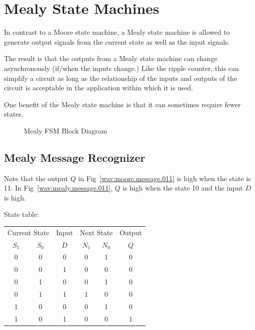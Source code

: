 \documentclass[10pt,letterpaper]{article}
\begin{document}
\FloatBarrier
\newpage

\section{Mealy State Machines}

In contrast to a Moore state machine, a Mealy state machine is allowed to 
generate output signals from the current state as well as the input signals.

The result is that the outputs from a Mealy state machine can change
asynchronously (if/when the inputs change.)
Like the ripple counter, this can simplify a circuit as long as the 
relationship of the inputs and outputs of the circuit is acceptable 
in the application within which it is used.

One benefit of the Mealy state machine is that it can sometimes require
fewer states.

\begin{figure}[ht]
\centering

\scalebox{.75}{}

\caption{Mealy FSM Block Diagram}
\label{wav:mealy.block.diagram}
\end{figure}

\subsection{Mealy Message Recognizer}

Note that the output $Q$ in Fig~\ref{wav:moore.message.011} is high when the state is 11. 
In Fig~\ref{wav:mealy.message.011}, $Q$ is high when the state 10 and the input $D$ is high.

State table:

\begin{center}
\begin{tabular}{|cc|c||cc|c|}
\hline
\multicolumn{2}{|c|}{Current State} & Input & \multicolumn{2}{|c|}{Next State} & Output \\
$S_1$ & $S_0$ & $D$ & $N_1$ & $N_0$ & $Q$ \\
\hline
\hline
0 & 0 &  0  & 0 & 1 &  0\\
0 & 0 &  1  & 0 & 0 &  0\\
0 & 1 &  0  & 0 & 1 &  0\\
0 & 1 &  1  & 1 & 0 &  0\\
1 & 0 &  0  & 0 & 1 &  0\\
1 & 0 &  1  & 0 & 0 &  1\\
\hline
\end{tabular}
\end{center}
\end{document}
